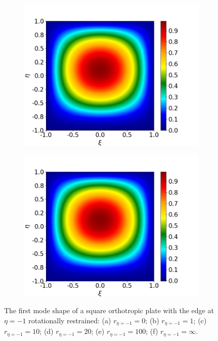 \documentclass[preprint,12pt]{elsarticle}
\begin{document}
\begin{figure}
\begin{subfigure}[b]{0.49\textwidth}
		\includegraphics[width=\textwidth]{figs/otho100.png}
		\caption[]%
		{{\small}}    
		\label{fig:otho100}
	\end{subfigure}
	\hfill
	\begin{subfigure}[b]{0.49\textwidth}   
		\centering 
		\includegraphics[width=\textwidth]{figs/othoinf.png}
		\caption[]%
		{{\small }}    
		\label{fig:othoinf}
	\end{subfigure}
	\caption[]  
	{\small The first mode shape of a square orthotropic plate with the edge at \(\eta=-1\) rotationally restrained: (a) \(r_{\eta=-1} = 0\); (b) \(r_{\eta=-1} = 1\); (c) \(r_{\eta=-1} = 10\); (d) \(r_{\eta=-1} = 20\); (e) \(r_{\eta=-1} = 100\); (f) \(r_{\eta=-1} = \infty\).}  
	\label{fig:oth}  
\end{figure}
\FloatBarrier
\end{document}
